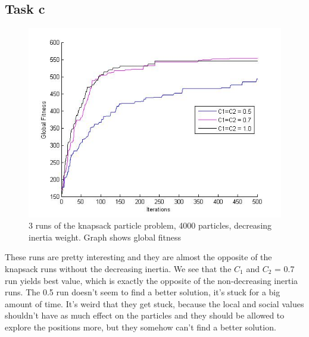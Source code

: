 \documentclass[12pt, a4paper]{article}
\begin{document}
\subsection{Task c}
\begin{figure}[H]
\begin{center}
\includegraphics[width=\linewidth]{KnapSack_withInertia}
\caption{3 runs of the knapsack particle problem, 4000 particles, decreasing inertia weight. Graph shows global fitness}
\end{center}
\end{figure}
These runs are pretty interesting and they are almost the opposite of the knapsack runs without the decreasing inertia. We see that the  $C_1$ and $C_2$ = 0.7 run yields best value, which is exactly the opposite of the non-decreasing inertia runs. The 0.5 run doesn't seem to find a better solution, it's stuck for a big amount of time. It's weird that they get stuck, because the local and social values shouldn't have as much effect on the particles and they should be allowed to explore the positions more, but they somehow can't find a better solution.
\end{document}

